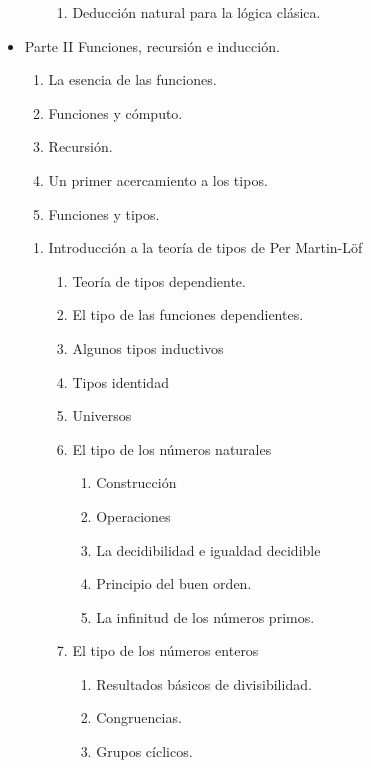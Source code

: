 \documentclass{article}
\begin{document}
\begin{itemize}
\begin{enumerate}
\begin{enumerate}
            \item Deducción natural para la lógica clásica.
        \end{enumerate}
    \end{enumerate}
    \item Parte II Funciones, recursión e inducción.
    \begin{enumerate}
        \item La esencia de las funciones.
        \item Funciones y cómputo.
        \item Recursión.
        \item Un primer acercamiento a los tipos.
        \item Funciones y tipos.
    \end{enumerate}
    \begin{enumerate}
        \item Introducción a la teoría de tipos de Per Martin-Löf
        \begin{enumerate}
            \item Teoría de tipos dependiente.
            \item El tipo de las funciones dependientes.
            \item Algunos tipos inductivos
            \item Tipos identidad
            \item Universos
            \item El tipo de los números naturales
            \begin{enumerate}
                \item Construcción
                \item Operaciones
                \item La decidibilidad e igualdad decidible
                \item Principio del buen orden.
                \item La infinitud de los números primos.
            \end{enumerate}
            \item El tipo de los números enteros
            \begin{enumerate}
                \item Resultados básicos de divisibilidad.
                \item Congruencias.
                \item Grupos cíclicos.
            \end{enumerate}

\end{enumerate}
\end{enumerate}
\end{itemize}
\end{document}
